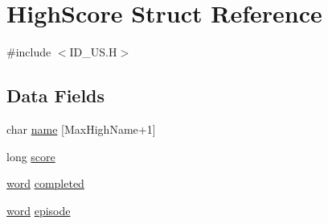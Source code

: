 \hypertarget{structHighScore}{
\section{HighScore Struct Reference}
\label{structHighScore}
}


{\ttfamily \#include $<$ID\_\-US.H$>$}

\subsection*{Data Fields}
\begin{DoxyCompactItemize}
\item 
char \hyperlink{structHighScore_a6fa7a41b1508f9fb0b847c00b236f905}{name} \mbox{[}MaxHighName+1\mbox{]}
\item 
long \hyperlink{structHighScore_ac6e9240847382cb4b430acaf13cab5ec}{score}
\item 
\hyperlink{ID__HEAD_8H_abad51e07ab6d26bec9f1f786c8d65bcd}{word} \hyperlink{structHighScore_ac587b9632e80e9e9bfc58da8f7e7c718}{completed}
\item 
\hyperlink{ID__HEAD_8H_abad51e07ab6d26bec9f1f786c8d65bcd}{word} \hyperlink{structHighScore_ab3194dca69b60b25ed50cfe60fa3ebd9}{episode}
\end{DoxyCompactItemize}


